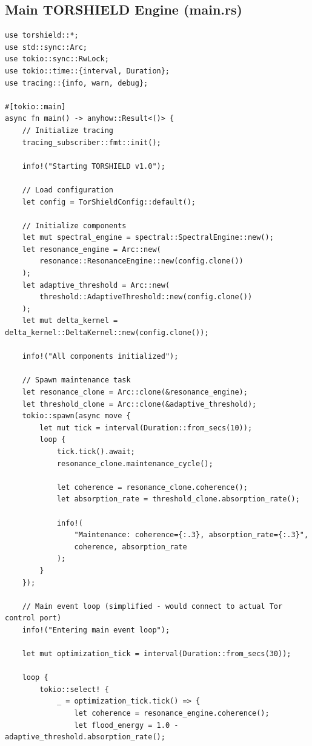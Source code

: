 \documentclass[11pt,a4paper]{article}
\begin{document}
\subsection{Main TORSHIELD Engine (main.rs)}

\begin{lstlisting}[style=rust]
use torshield::*;
use std::sync::Arc;
use tokio::sync::RwLock;
use tokio::time::{interval, Duration};
use tracing::{info, warn, debug};

#[tokio::main]
async fn main() -> anyhow::Result<()> {
    // Initialize tracing
    tracing_subscriber::fmt::init();
    
    info!("Starting TORSHIELD v1.0");
    
    // Load configuration
    let config = TorShieldConfig::default();
    
    // Initialize components
    let mut spectral_engine = spectral::SpectralEngine::new();
    let resonance_engine = Arc::new(
        resonance::ResonanceEngine::new(config.clone())
    );
    let adaptive_threshold = Arc::new(
        threshold::AdaptiveThreshold::new(config.clone())
    );
    let mut delta_kernel = delta_kernel::DeltaKernel::new(config.clone());
    
    info!("All components initialized");
    
    // Spawn maintenance task
    let resonance_clone = Arc::clone(&resonance_engine);
    let threshold_clone = Arc::clone(&adaptive_threshold);
    tokio::spawn(async move {
        let mut tick = interval(Duration::from_secs(10));
        loop {
            tick.tick().await;
            resonance_clone.maintenance_cycle();
            
            let coherence = resonance_clone.coherence();
            let absorption_rate = threshold_clone.absorption_rate();
            
            info!(
                "Maintenance: coherence={:.3}, absorption_rate={:.3}",
                coherence, absorption_rate
            );
        }
    });
    
    // Main event loop (simplified - would connect to actual Tor control port)
    info!("Entering main event loop");
    
    let mut optimization_tick = interval(Duration::from_secs(30));
    
    loop {
        tokio::select! {
            _ = optimization_tick.tick() => {
                let coherence = resonance_engine.coherence();
                let flood_energy = 1.0 - adaptive_threshold.absorption_rate();
                

\end{lstlisting}
\end{document}
